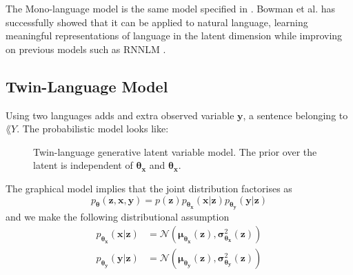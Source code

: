 The Mono-language model is the same model specified in
\cite{kingma_auto-encoding_2013}. Bowman et al. has successfully showed that it
can be applied to natural language, learning meaningful representations of
language in the latent dimension \cite{bowman_generating_2015} while improving
on previous models such as RNNLM \cite{conf/icassp/MikolovKBCK11}.

\subsection{Twin-Language Model}

Using two languages adds and extra observed variable $\bm{y}$, a sentence belonging to
$\lang{Y}$. The probabilistic model looks like:
\begin{figure}[H]
  \center
  \caption{Twin-language generative latent variable model. The prior over
    the latent is independent of $\bm{\theta}_{\bm{x}}$ and $\bm{\theta}_{\bm{x}}$.}
\end{figure}

The graphical model implies that the joint distribution factorises as
\begin{equation}
  \label{eq:joint_generative}
  p_{\bm{\theta}}(\bm{\bm{z}}, \bm{x}, \bm{y}) = p(\bm{z})p_{\bm{\theta}_{\bm{x}}}(\bm{x} | \bm{z})p_{\bm{\theta}_{\bm{y}}}(\bm{y} | \bm{z})
\end{equation}
and we make the following distributional assumption
\begin{align}
  p_{\bm{\theta}_{\bm{x}}}(\bm{x} | \bm{z}) & = \mathcal{N}(\bm{\mu}_{\bm{\theta}_{\bm{x}}}(\bm{z}), \bm{\sigma}^2_{\bm{\theta}_{\bm{x}}}(\bm{z})) \\
  p_{\bm{\theta}_{\bm{y}}}(\bm{y} | \bm{z}) & = \mathcal{N}(\bm{\mu}_{\bm{\theta}_{\bm{y}}}(\bm{z}), \bm{\sigma}^2_{\bm{\theta}_{\bm{y}}}(\bm{z}))
\end{align}

